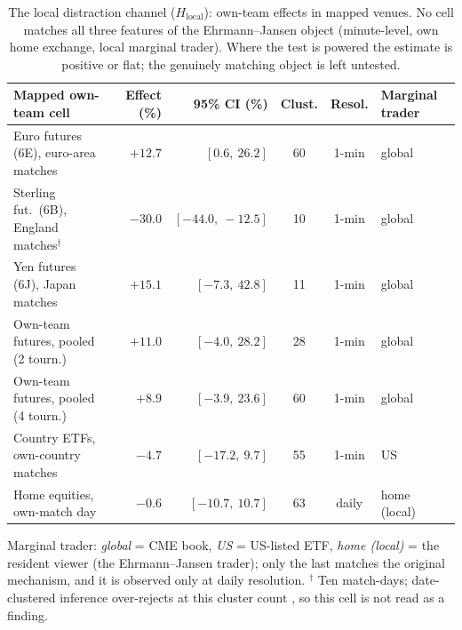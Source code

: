 \documentclass[12pt]{article}
\begin{document}
\begin{table}[h]\centering\footnotesize\setlength{\tabcolsep}{4pt}
\caption{The local distraction channel ($H_{\text{local}}$): own-team effects in mapped venues. No cell matches all three features of the Ehrmann--Jansen object (minute-level, own home exchange, local marginal trader). Where the test is powered the estimate is positive or flat; the genuinely matching object is left untested.}\label{tab:local}
\begin{tabular}{lrrcc>{\raggedright\arraybackslash}p{1.7cm}}\toprule
Mapped own-team cell & Effect (\%) & 95\% CI (\%) & Clust. & Resol. & Marginal trader \\\midrule
Euro futures (6E), euro-area matches   & $+12.7$ & $[0.6,\ 26.2]$  & 60 & 1-min & global \\
Sterling fut.\ (6B), England matches$^{\dagger}$ & $-30.0$ & $[-44.0,\ -12.5]$ & 10 & 1-min & global \\
Yen futures (6J), Japan matches        & $+15.1$ & $[-7.3,\ 42.8]$ & 11 & 1-min & global \\
Own-team futures, pooled (2 tourn.)    & $+11.0$ & $[-4.0,\ 28.2]$ & 28 & 1-min & global \\
Own-team futures, pooled (4 tourn.)    & $+8.9$  & $[-3.9,\ 23.6]$ & 60 & 1-min & global \\
Country ETFs, own-country matches      & $-4.7$  & $[-17.2,\ 9.7]$ & 55 & 1-min & US \\
Home equities, own-match day           & $-0.6$  & $[-10.7,\ 10.7]$& 63 & daily & home (local) \\\bottomrule
\end{tabular}
\par\smallskip\footnotesize Marginal trader: \emph{global} = CME book, \emph{US} = US-listed ETF, \emph{home (local)} = the resident viewer (the Ehrmann--Jansen trader); only the last matches the original mechanism, and it is observed only at daily resolution. $^{\dagger}$ Ten match-days; date-clustered inference over-rejects at this cluster count \cite{cameron2008}, so this cell is not read as a finding.
\end{table}
\end{document}
